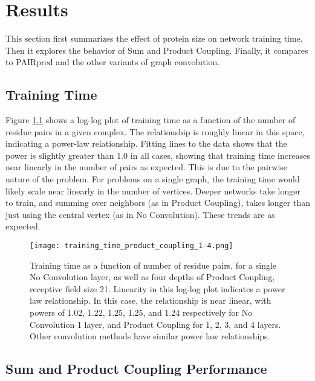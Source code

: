 \chapter{Results}
\label{chap:results}


This section first summarizes the effect of protein size on network training time.
Then it explores the behavior of Sum and Product Coupling.
Finally, it compares to PAIRpred and the other variants of graph convolution.


\section{Training Time}

Figure \ref{fig:train_times} shows a log-log plot of training time as a function of the number of residue pairs in a given complex.
The relationship is roughly linear in this space, indicating a power-law relationship.
Fitting lines to the data shows that the power is slightly greater than 1.0 in all cases, showing that training time increases near linearly in the number of pairs as expected.
This is due to the pairwise nature of the problem.
For problems on a single graph, the training time would likely scale near linearly in the number of vertices.
Deeper networks take longer to train, and summing over neighbors (as in Product Coupling), takes longer than just using the central vertex (as in No Convolution).
These trends are as expected. 


\begin{figure}
	\texttt{[image: training\_time\_product\_coupling\_1-4.png]}
	\caption{Training time as a function of number of residue pairs, for a single No Convolution layer, as well as four depths of Product Coupling, receptive field size 21. Linearity in this log-log plot indicates a power law relationship. In this case, the relationship is near linear, with powers of 1.02, 1.22, 1.25, 1.25, and 1.24 respectively for No Convolution 1 layer, and Product Coupling for 1, 2, 3, and 4 layers. Other convolution methods have similar power law relationships. 
		\label{fig:train_times}}
\end{figure}




\section{Sum and Product Coupling Performance}

